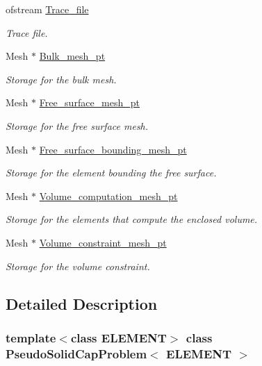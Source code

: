 \begin{DoxyCompactItemize}
\item 
ofstream \hyperlink{classPseudoSolidCapProblem_a81d2d9915ba7d9a9a691ca2f2080b6b4}{Trace\+\_\+file}
\begin{DoxyCompactList}\small\item\em Trace file. \end{DoxyCompactList}\item 
Mesh $\ast$ \hyperlink{classPseudoSolidCapProblem_a6d4520b30d05f3dde12ea9bae9d62d0b}{Bulk\+\_\+mesh\+\_\+pt}
\begin{DoxyCompactList}\small\item\em Storage for the bulk mesh. \end{DoxyCompactList}\item 
Mesh $\ast$ \hyperlink{classPseudoSolidCapProblem_ab334d082c008553389374a90f732df2f}{Free\+\_\+surface\+\_\+mesh\+\_\+pt}
\begin{DoxyCompactList}\small\item\em Storage for the free surface mesh. \end{DoxyCompactList}\item 
Mesh $\ast$ \hyperlink{classPseudoSolidCapProblem_a3e45f375f3aa934391ca8e20e11410e4}{Free\+\_\+surface\+\_\+bounding\+\_\+mesh\+\_\+pt}
\begin{DoxyCompactList}\small\item\em Storage for the element bounding the free surface. \end{DoxyCompactList}\item 
Mesh $\ast$ \hyperlink{classPseudoSolidCapProblem_aa9c678c2bfec0afcb94f356aeaa19089}{Volume\+\_\+computation\+\_\+mesh\+\_\+pt}
\begin{DoxyCompactList}\small\item\em Storage for the elements that compute the enclosed volume. \end{DoxyCompactList}\item 
Mesh $\ast$ \hyperlink{classPseudoSolidCapProblem_a27f4baf9c47cb17e15e6b7a6065fdfe0}{Volume\+\_\+constraint\+\_\+mesh\+\_\+pt}
\begin{DoxyCompactList}\small\item\em Storage for the volume constraint. \end{DoxyCompactList}\end{DoxyCompactItemize}


\subsection{Detailed Description}
\subsubsection*{template$<$class E\+L\+E\+M\+E\+NT$>$\newline
class Pseudo\+Solid\+Cap\+Problem$<$ E\+L\+E\+M\+E\+N\+T $>$}

